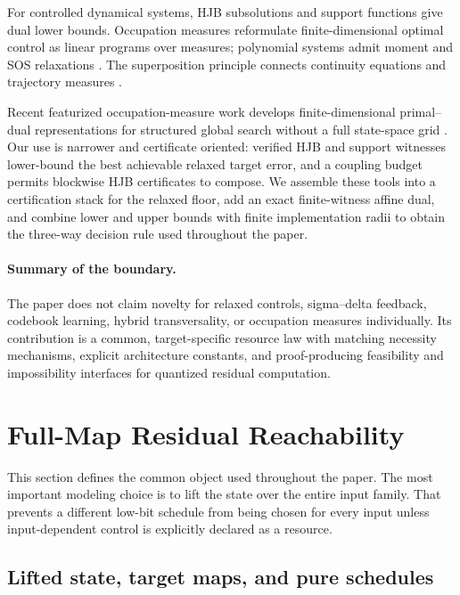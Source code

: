 \documentclass[twoside,11pt]{article}
\begin{document}
For controlled dynamical systems, HJB subsolutions and support functions give dual lower bounds.  Occupation measures reformulate finite-dimensional optimal control as linear programs over measures; polynomial systems admit moment and SOS relaxations \citep{LasserreEtAl2008,ClaeysDaafouzHenrion2016}.  The superposition principle connects continuity equations and trajectory measures \citep{AmbrosioGigliSavare2008}.

Recent featurized occupation-measure work develops finite-dimensional primal--dual representations for structured global search without a full state-space grid \citep{WeiTaoTanNie2026FOM}.  Our use is narrower and certificate oriented: verified HJB and support witnesses lower-bound the best achievable relaxed target error, and a coupling budget permits blockwise HJB certificates to compose.  We assemble these tools into a certification stack for the relaxed floor, add an exact finite-witness affine dual, and combine lower and upper bounds with finite implementation radii to obtain the three-way decision rule used throughout the paper.

\paragraph{Summary of the boundary.}
The paper does not claim novelty for relaxed controls, sigma--delta feedback, codebook learning, hybrid transversality, or occupation measures individually.  Its contribution is a common, target-specific resource law with matching necessity mechanisms, explicit architecture constants, and proof-producing feasibility and impossibility interfaces for quantized residual computation.

\section{Full-Map Residual Reachability}
\label{sec:formal-model}
\label{sec:abstract-theory}

This section defines the common object used throughout the paper.  The most important modeling choice is to lift the state over the entire input family.  That prevents a different low-bit schedule from being chosen for every input unless input-dependent control is explicitly declared as a resource.

\subsection{Lifted state, target maps, and pure schedules}
\end{document}
